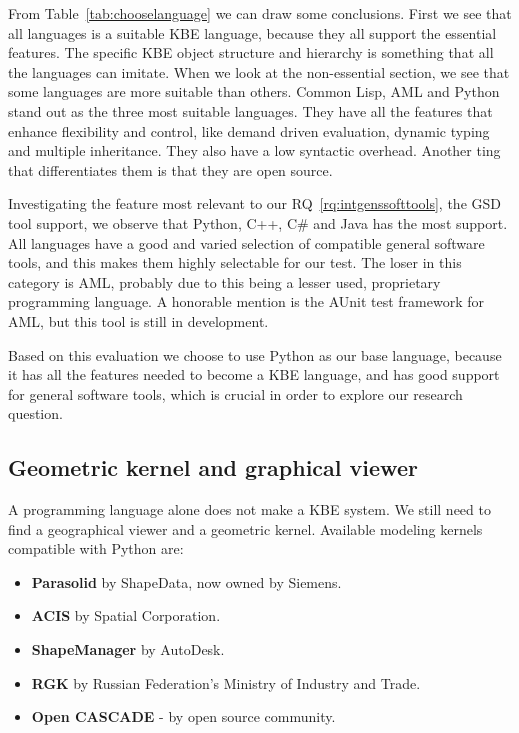 From Table~\ref{tab:chooselanguage} we can draw some conclusions. First we see that all languages is a suitable KBE language, because they all support the essential features. The specific KBE object structure and hierarchy is something that all the languages can imitate. When we look at the non-essential section, we see that some languages are more suitable than others. Common Lisp, AML and Python stand out as the three most suitable languages. They have all the features that enhance flexibility and control, like demand driven evaluation, dynamic typing and multiple inheritance. They also have a low syntactic overhead. Another ting that differentiates them is that they are open source.

Investigating the feature most relevant to our RQ~\ref{rq:intgenssofttools}, the GSD tool support, we observe that Python, C++, C\# and Java has the most support. All languages have a good and varied selection of compatible general software tools, and this makes them highly selectable for our test. The loser in this category is AML, probably due to this being a lesser used, proprietary programming language. A honorable mention is the AUnit test framework for AML, but this tool is still in development.

Based on this evaluation we choose to use Python as our base language, because it has all the features needed to become a KBE language, and has good support for general software tools, which is crucial in order to explore our research question.


\subsection{Geometric kernel and graphical viewer} %
\label{sub:geometric_kernel_and_graphical_viewer}
A programming language alone does not make a KBE system. We still need to find a geographical viewer and a geometric kernel. Available modeling kernels compatible with Python are:

\begin{itemize}
  \item \textbf{Parasolid} by ShapeData, now owned by Siemens.

  \item \textbf{ACIS} by Spatial Corporation.

  \item \textbf{ShapeManager} by AutoDesk.

  \item \textbf{RGK} by Russian Federation's Ministry of Industry and Trade.

  \item \textbf{Open CASCADE} - by open source community.
\end{itemize}

